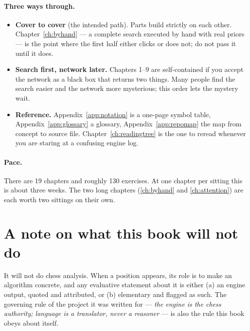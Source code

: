 \paragraph{Three ways through.}
\begin{itemize}
\item \textbf{Cover to cover} (the intended path). Parts build strictly on each other.
  Chapter~\ref{ch:byhand} --- a complete search executed by hand with real priors --- is
  the point where the first half either clicks or does not; do not pass it until it does.
\item \textbf{Search first, network later.} Chapters 1--9 are self-contained if you accept
  the network as a black box that returns two things. Many people find the search easier
  and the network more mysterious; this order lets the mystery wait.
\item \textbf{Reference.} Appendix~\ref{app:notation} is a one-page symbol table,
  Appendix~\ref{app:glossary} a glossary, Appendix~\ref{app:repomap} the map from concept
  to source file. Chapter~\ref{ch:readingtree} is the one to reread whenever you are
  staring at a confusing engine log.
\end{itemize}

\paragraph{Pace.} There are 19 chapters and roughly 130 exercises. At one chapter per
sitting this is about three weeks. The two long chapters (\ref{ch:byhand} and
\ref{ch:attention}) are each worth two sittings on their own.

\section*{A note on what this book will not do}

It will not do chess analysis. When a position appears, its role is to make an algorithm
concrete, and any evaluative statement about it is either (a) an engine output, quoted and
attributed, or (b) elementary and flagged as such. The governing rule of the project it
was written for --- \emph{the engine is the chess authority; language is a translator,
never a reasoner} --- is also the rule this book obeys about itself.
